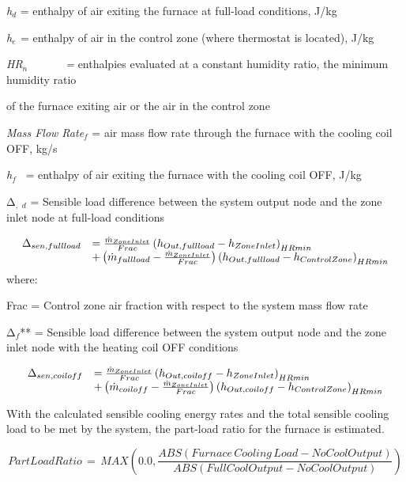 \emph{h\(_{d}\)} = enthalpy of air exiting the furnace at full-load conditions, J/kg

\emph{h\(_{e}\)}\(_{ }\) = enthalpy of air in the control zone (where thermostat is located), J/kg

\emph{HR\(_{n}\)~~~~~~ =} enthalpies evaluated at a constant humidity ratio, the minimum humidity ratio

of the furnace exiting air or the air in the control zone

\emph{Mass Flow Rate\(_{f}\)} = air mass flow rate through the furnace with the cooling coil OFF, kg/s

\emph{h\(_{f}\)}~ = enthalpy of air exiting the furnace with the cooling coil OFF, J/kg

Δ\(_{,}\) \emph{\(_{d}\)} = Sensible load difference between the system output node and the zone inlet node at full-load conditions

\begin{equation}
  \begin{array}{rl}
    \Delta_{sen,full load} &= \frac{\dot{m}_{ZoneInlet}}{Frac} \PB{h_{Out,full load} - h_{ZoneInlet}}_{HRmin} \\
                           &+ \PB{\dot{m}_{full load} - \frac{\dot{m}_{ZoneInlet}}{Frac}} \PB{h_{Out,full load} - h_{ControlZone}}_{HRmin}
  \end{array}
\end{equation}
where:

Frac = Control zone air fraction with respect to the system mass flow rate

Δ\(_{f}\)** = Sensible load difference between the system output node and the zone inlet node with the heating coil OFF conditions

\begin{equation}
  \begin{array}{rl}
    \Delta_{sen,coil off} &= \frac{\dot{m}_{ZoneInlet}}{Frac} \PB{h_{Out,coil off} - h_{ZoneInlet}}_{HRmin} \\
                           &+ \PB{\dot{m}_{coil off} - \frac{\dot{m}_{ZoneInlet}}{Frac}} \PB{h_{Out,coil off} - h_{ControlZone}}_{HRmin}
  \end{array}
\end{equation}

With the calculated sensible cooling energy rates and the total sensible cooling load to be met by the system, the part-load ratio for the furnace is estimated.

\begin{equation}
PartLoadRatio\, = \,MAX\left( {0.0,\frac{{ABS\left( {Furnace\,Cooling\,Load - NoCoolOutput} \right)}}{{ABS\left( {FullCoolOutput - NoCoolOutput} \right)}}} \right)
\end{equation}


